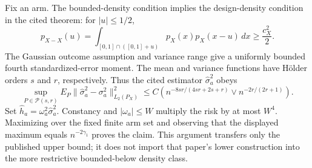 Fix an arm.  The bounded-density condition implies the design-density condition in the cited theorem: for \(|u|\leq1/2\),
\[
p_{X-X}(u)=\int_{[0,1]\cap([0,1]+u)}p_X(x)p_X(x-u)\,dx
\geq\frac{c_X^2}{2}.
\]
The Gaussian outcome assumption and variance range give a uniformly bounded fourth standardized-error moment.  The mean and variance functions have Hölder orders \(s\) and \(r\), respectively.  Thus the cited estimator \(\widehat\sigma_a^2\) obeys
\[
\sup_{P\in\mathcal P(s,r)}E_P\|\widehat\sigma_a^2-\sigma_a^2\|_{L_2(P_X)}^2
\leq C\left(n^{-8sr/(4sr+2s+r)}\vee n^{-2r/(2r+1)}\right).
\]
Set \(\widehat h_a=\omega_a^2\widehat\sigma_a^2\).  Constancy and \(|\omega_a|\leq W\) multiply the risk by at most \(W^4\).  Maximizing over the fixed finite arm set and observing that the displayed maximum equals \(n^{-2\gamma_1}\) proves the claim.  This argument transfers only the published upper bound; it does not import that paper's lower construction into the more restrictive bounded-below density class.